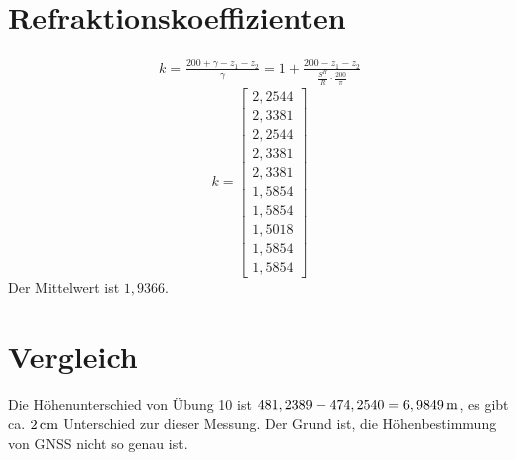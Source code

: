 \section{Refraktionskoeffizienten}
\begin{gather*}
	k = \frac{200 + \gamma - z_1 - z_2}{\gamma} = 1 + \frac{200 - z_1 - z_2}{\frac{S^H}{R} \cdot \frac{200}{\pi}}
\end{gather*}
\begin{equation*}
	k = \begin{bmatrix}
	2,2544\\
	2,3381\\
	2,2544\\
	2,3381\\
	2,3381\\
	1,5854\\
	1,5854\\
	1,5018\\
	1,5854\\
	1,5854
	\end{bmatrix} 
\end{equation*}
Der Mittelwert ist $1,9366$.
\section{Vergleich}
Die Höhenunterschied von Übung 10 ist $481,2389 - 474,2540 = 6,9849 \,\mathrm{m}$, es gibt ca. $2 \,\mathrm{cm}$ Unterschied zur dieser Messung. Der Grund ist, die Höhenbestimmung von GNSS nicht so genau ist.   

